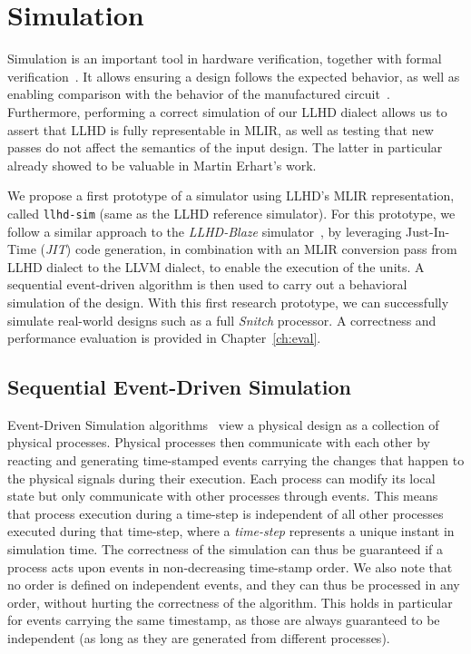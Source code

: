 
\chapter{Simulation}
\label{ch:sim}

Simulation is an important tool in hardware verification, together with formal verification~\cite{YuanLu2001, Kumar1998}. It allows ensuring a design follows the expected behavior, as well as enabling comparison with the behavior of the manufactured circuit~\cite{Ashenden1994}.
Furthermore, performing a correct simulation of our LLHD dialect allows us to assert that LLHD is fully representable in MLIR, as well as testing that new passes do not affect the semantics of the input design. The latter in particular already showed to be valuable in Martin Erhart's work.

We propose a first prototype of a simulator using LLHD's MLIR representation, called \texttt{llhd-sim} (same as the LLHD reference simulator). For this prototype, we follow a similar approach to the \textit{LLHD-Blaze} simulator~\cite{Schuiki2020}, by leveraging Just-In-Time (\textit{JIT}) code generation, in combination with an MLIR conversion pass from LLHD dialect to the LLVM dialect, to enable the execution of the units. A sequential event-driven algorithm is then used to carry out a behavioral simulation of the design. With this first research prototype, we can successfully simulate real-world designs such as a full \textit{Snitch} \cite{Zaruba2020} processor. A correctness and performance evaluation is provided in Chapter~\ref{ch:eval}.


\section{Sequential Event-Driven Simulation}
Event-Driven Simulation algorithms~\cite{Ashenden1994} view a physical design as a collection of physical processes. Physical processes then communicate with each other by reacting and generating time-stamped events carrying the changes that happen to the physical signals during their execution. Each process can modify its local state but only communicate with other processes through events. This means that process execution during a time-step is independent of all other processes executed during that time-step, where a \textit{time-step} represents a unique instant in simulation time. The correctness of the simulation can thus be guaranteed if a process acts upon events in non-decreasing time-stamp order. We also note that no order is defined on independent events, and they can thus be processed in any order, without hurting the correctness of the algorithm. This holds in particular for events carrying the same timestamp, as those are always guaranteed to be independent (as long as they are generated from different processes).

